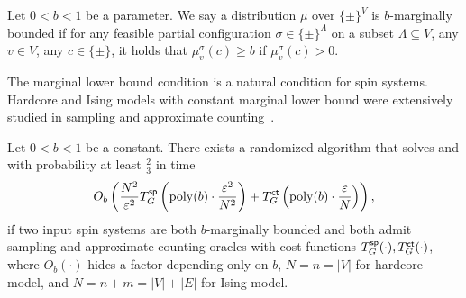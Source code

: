 \begin{condition}\label{def:marlow}
Let $0 < b < 1$ be a parameter. We say a distribution $\mu$ over $\{\pm\}^V$ is $b$-marginally bounded if
for any  feasible partial configuration $\sigma \in \{\pm\}^\Lambda$ on a subset $\Lambda \subseteq V$, any $v \in V$, any $c \in \{\pm\}$, it holds that $\mu_v^\sigma(c) \geq b$ if $\mu_v^\sigma (c) > 0$.
\end{condition}
The marginal lower bound condition is a natural condition for spin systems. Hardcore and Ising models with constant marginal lower bound were extensively studied in sampling and approximate counting~\cite{jerrum2003counting,Wei06,Sly10,CLV21}. %

\begin{theorem}\label{thm:Ising-1}
Let $0 < b < 1$ be a constant.
There exists a randomized algorithm that solves 
 and  with probability at least $\frac{2}{3}$ in time 
\begin{align*}
     O_b\left(\frac{N^2}{\varepsilon^2} T^{\textsf{sp}}_G \left(\mathrm{poly}(b) \cdot \frac{\varepsilon^2}{ N^2}\right) + T^{\textsf{ct}}_G\left(\mathrm{poly}(b) \cdot \frac{\varepsilon}{ N}\right)\right),
\end{align*}
 if two input spin systems are both $b$-marginally bounded and both admit sampling and approximate counting oracles with cost functions $T^{\textsf{sp}}_G(\cdot),T^{\textsf{ct}}_G(\cdot)$, 
 where $O_b(\cdot)$ hides a factor depending only on $b$,  $N = n = |V|$ for hardcore model, and $N = n + m = |V| + |E|$ for Ising model.
\end{theorem}


